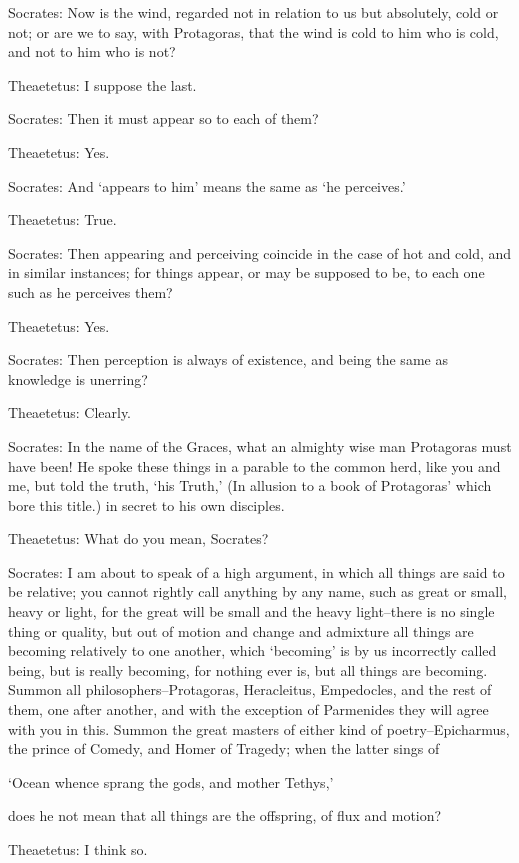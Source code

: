 Socrates: Now is the wind, regarded not in relation to us but
absolutely, cold or not; or are we to say, with Protagoras, that the
wind is cold to him who is cold, and not to him who is not?

Theaetetus: I suppose the last.

Socrates: Then it must appear so to each of them?

Theaetetus: Yes.

Socrates: And `appears to him' means the same as `he perceives.'

Theaetetus: True.

Socrates: Then appearing and perceiving coincide in the case of hot and
cold, and in similar instances; for things appear, or may be supposed to
be, to each one such as he perceives them?

Theaetetus: Yes.

Socrates: Then perception is always of existence, and being the same as
knowledge is unerring?

Theaetetus: Clearly.

Socrates: In the name of the Graces, what an almighty wise man
Protagoras must have been! He spoke these things in a parable to the
common herd, like you and me, but told the truth, `his Truth,' (In
allusion to a book of Protagoras' which bore this title.) in secret to
his own disciples.

Theaetetus: What do you mean, Socrates?

Socrates: I am about to speak of a high argument, in which all things
are said to be relative; you cannot rightly call anything by any name,
such as great or small, heavy or light, for the great will be small and
the heavy light--there is no single thing or quality, but out of motion
and change and admixture all things are becoming relatively to one
another, which `becoming' is by us incorrectly called being, but is
really becoming, for nothing ever is, but all things are becoming.
Summon all philosophers--Protagoras, Heracleitus, Empedocles, and the
rest of them, one after another, and with the exception of Parmenides
they will agree with you in this. Summon the great masters of either
kind of poetry--Epicharmus, the prince of Comedy, and Homer of Tragedy;
when the latter sings of

`Ocean whence sprang the gods, and mother Tethys,'

does he not mean that all things are the offspring, of flux and motion?

Theaetetus: I think so.

